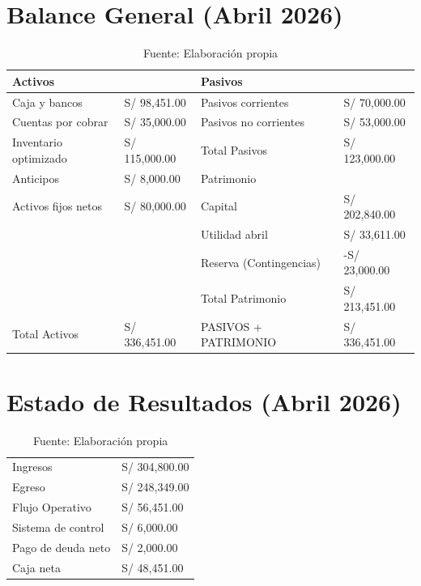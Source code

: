 
\section*{Balance General (Abril 2026)}

\begin{table}[H]
\centering
\begin{tabular}{|L{4cm}|R{2.8cm}|L{5cm}|R{3cm}|}
\hline
{} \textbf{Activos} & & \textbf{Pasivos} & \\ \hline
Caja y bancos & S/ 98,451.00 & Pasivos corrientes & S/ 70,000.00 \\
Cuentas por cobrar & S/ 35,000.00 & Pasivos no corrientes & S/ 53,000.00 \\
Inventario optimizado & S/ 115,000.00 & Total Pasivos & S/ 123,000.00 \\
 Anticipos & S/ 8,000.00 & Patrimonio & \\ 
Activos fijos netos & S/ 80,000.00 & Capital & S/ 202,840.00 \\
& & Utilidad abril & S/ 33,611.00 \\
& & Reserva (Contingencias) & -S/ 23,000.00 \\
 & & Total Patrimonio & S/ 213,451.00 \\ \hline
{} Total Activos & S/ 336,451.00 & PASIVOS + PATRIMONIO & S/ 336,451.00 \\ \hline
\end{tabular}
\caption{Fuente: Elaboración propia}
\end{table}

\vspace{0.5cm}

\section*{Estado de Resultados (Abril 2026)}

\begin{table}[H]
\centering
\begin{tabular}{|L{6cm}|R{4cm}|}
\hline
Ingresos & S/ 304,800.00 \\
Egreso & S/ 248,349.00 \\
 Flujo Operativo & S/ 56,451.00 \\
Sistema de control & S/ 6,000.00 \\
Pago de deuda neto & S/ 2,000.00 \\
 Caja neta & S/ 48,451.00 \\ \hline
\end{tabular}
\caption{Fuente: Elaboración propia}
\end{table}

